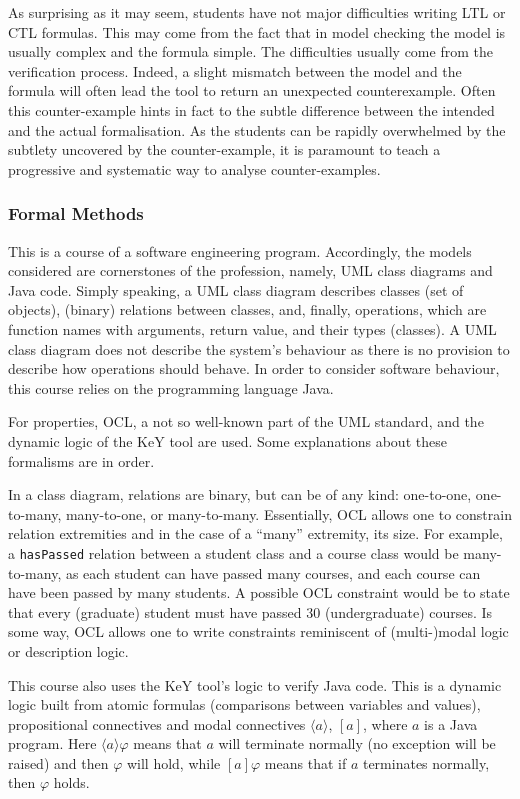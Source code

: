 \documentclass[a4paper,UKenglish]{lipics}
\begin{document}
As surprising as it may seem, students have not major difficulties writing LTL or CTL formulas. This may come from the fact that in model checking the model is usually complex and the formula simple. The difficulties usually come from the verification process. Indeed, a slight mismatch between the model and the formula will often lead the tool to return an unexpected counterexample. Often this counter-example hints in fact to the subtle difference between the intended and the actual formalisation. As the students can be rapidly overwhelmed by the subtlety uncovered by the counter-example, it is paramount to teach a progressive and systematic way to analyse counter-examples. 
\subsubsection{Formal Methods}\label{SECFM}
This is a course of a software engineering program. Accordingly, the models considered are cornerstones of the profession, namely, UML class diagrams and Java code. Simply speaking, a UML class diagram describes classes (set of objects), (binary) relations between classes, and, finally, operations, which are function names with arguments, return value, and their types (classes). A UML class diagram does not describe the system's behaviour as there is no provision to describe how operations should behave. In order to consider software behaviour, this course relies on the programming language Java.

For properties, OCL, a not so well-known part of the UML standard, and the dynamic logic of the KeY tool are used. Some explanations about these formalisms are in order.

In a class diagram, relations are binary, but can be of any kind: one-to-one, one-to-many, many-to-one, or many-to-many. Essentially, OCL allows one to constrain relation extremities and in the case of a ``many'' extremity, its size. For example, a \texttt{hasPassed} relation between a student class and a course class would be many-to-many, as each student can have passed many courses, and each course can have been passed by many students. A possible OCL constraint would be to state that every (graduate) student must have passed $30$ (undergraduate) courses. Is some way, OCL allows one to write constraints reminiscent of (multi-)modal logic or description logic.

This course also uses the KeY tool's logic to verify Java code. This is a dynamic logic built from atomic formulas (comparisons between variables and values), propositional connectives and modal connectives $\langle a\rangle$, $[a]$, where $a$ is a Java program. Here $\langle a\rangle\varphi$ means that $a$ will terminate normally (no exception will be raised) and then $\varphi$ will hold, while $[a]\varphi$ means that if $a$ terminates normally, then $\varphi$ holds.
\end{document}
